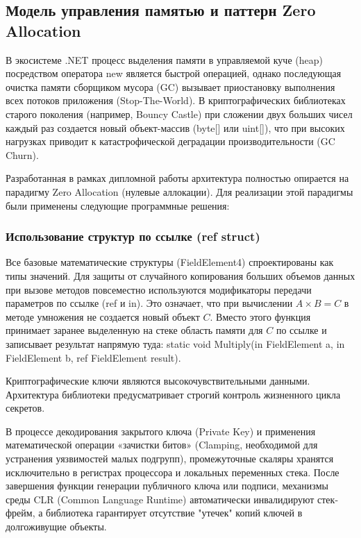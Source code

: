 \subsection{Модель управления памятью и паттерн Zero Allocation}

В экосистеме .NET процесс выделения памяти в управляемой куче (heap) посредством оператора new является быстрой операцией, однако последующая очистка памяти сборщиком мусора (GC) вызывает приостановку выполнения всех потоков приложения (Stop-The-World). В криптографических библиотеках старого поколения (например, Bouncy Castle) при сложении двух больших чисел каждый раз создается новый объект-массив (byte[] или uint[]), что при высоких нагрузках приводит к катастрофической деградации производительности (GC Churn).

Разработанная в рамках дипломной работы архитектура полностью опирается на парадигму Zero Allocation (нулевые аллокации). Для реализации этой парадигмы были применены следующие программные решения:

\subsubsection{Использование структур по ссылке (ref struct)}

Все базовые математические структуры (FieldElement4) спроектированы как типы значений. Для защиты от случайного копирования больших объемов данных при вызове методов повсеместно используются модификаторы передачи параметров по ссылке (ref и in). 
Это означает, что при вычислении $A \times B = C$ в методе умножения не создается новый объект $C$. Вместо этого функция принимает заранее выделенную на стеке область памяти для $C$ по ссылке и записывает результат напрямую туда:
static void Multiply(in FieldElement a, in FieldElement b, ref FieldElement result).

Криптографические ключи являются высокочувствительными данными. Архитектура библиотеки предусматривает строгий контроль жизненного цикла секретов. 

В процессе декодирования закрытого ключа (Private Key) и применения математической операции «зачистки битов» (Clamping, необходимой для устранения уязвимостей малых подгрупп), промежуточные скаляры хранятся исключительно в регистрах процессора и локальных переменных стека. После завершения функции генерации публичного ключа или подписи, механизмы среды CLR (Common Language Runtime) автоматически инвалидируют стек-фрейм, а библиотека гарантирует отсутствие "утечек" копий ключей в долгоживущие объекты.
